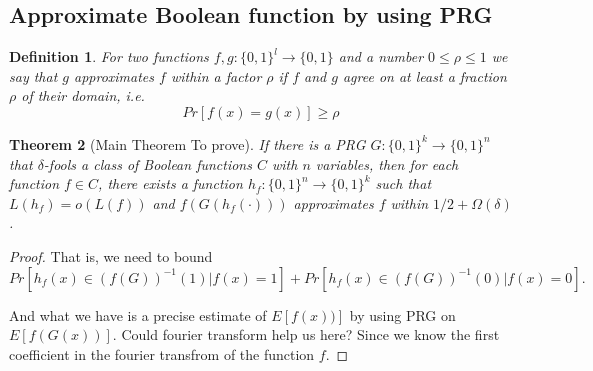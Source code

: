 \documentclass[12pt]{article}
\newtheorem{theorem}{Theorem}[section]
\newtheorem{definition}[theorem]{Definition}
\renewcommand{\.}{,\ldots,}
\begin{document}
\subsection{Approximate Boolean function by using PRG}
\begin{definition}
For two functions $f, g : \{0, 1\}^l \rightarrow \{0, 1\}$ and a number $0 \le \rho \leq 1$ we say that $g$
approximates $f$ within a factor $\rho$ if $f$ and $g$ agree on at least a fraction $\rho$ of their
domain, i.e.$$ Pr[f(x) = g(x)] \geq  \rho$$
\end{definition}

\begin{theorem}[Main Theorem To prove]
If there is a PRG $G:\{0,1\}^k\rightarrow \{0,1\}^n$ that $\delta$-fools  a class of Boolean functions $C$ with $n$ variables, then for each function $f\in C$, there exists a function $h_f:\{0,1\}^n\rightarrow \{0,1\}^k$  such that $L(h_f)=o(L(f))$ and $f(G(h_f(\cdot )))$ approximates $f$ within $1/2+\Omega(\delta)$.
\end{theorem}

\begin{proof}
That is, we  need to bound 
$$Pr[h_f(x)\in (f(G))^{-1}(1)|f(x)=1]+Pr[h_f(x)\in (f(G))^{-1}(0)|f(x)=0].$$

And what we have is a precise estimate of $E[f(x))]$ by using PRG on $E[f(G(x))]$. Could fourier transform help us here?  Since we know the first coefficient in the fourier transfrom of the function $f$. 
\end{proof}




\end{document}
